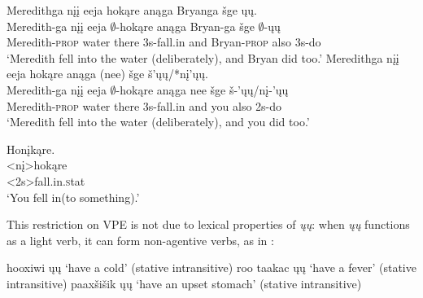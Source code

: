 \documentclass[output=paper]{LSP/langsci}
\begin{document}
\begin{exe}
\ex
\begin{xlist}
\ex
\glll Meredithga nįį eeja hokąre anąga Bryanga šge ųų.\\
Meredith-ga nįį eeja $\emptyset$-hokąre anąga Bryan-ga šge $\emptyset$-ųų\\
Meredith-\textsc{prop} water there {\textsc 3s}-fall.in and Bryan-\textsc{prop} also {\textsc 3s}-do\\
\trans `Meredith fell into the water (deliberately), and Bryan did too.'
\ex
\glll Meredithga nįį eeja hokąre anąga (nee) šge š'ųų/*nį'ųų.\\
Meredith-ga nįį eeja $\emptyset$-hokąre anąga nee šge š-'ųų/nį-'ųų\\
Meredith-\textsc{prop} water there {\textsc 3s}-fall.in and you also {\textsc 2s}-do\\
\trans `Meredith fell into the water (deliberately), and you did too.'
\end{xlist}
\end{exe}

\begin{exe}
\ex
\glll Honįkąre.\\
<nį>hokąre\\
<{\textsc 2s}>fall.in.{\textsc stat}\\
\trans `You fell in(to something).' \citep{Hartmann2012}
\end{exe}
	
This restriction on VPE is not due to lexical properties of \emph{ųų}: when \emph{ųų} functions as a light verb, it can form non-agentive verbs, as in :


\begin{singlespacing}
\begin{exe}
\ex
\begin{xlist}
\ex
hooxiwi ųų `have a cold' (stative intransitive)
\vspace{12pt}
\ex
roo taakac ųų `have a fever' (stative intransitive)
\vspace{12pt}
\ex
paaxšišik ųų `have an upset stomach' (stative intransitive)\\
\citep{Hartmann2012}
\end{xlist}
\end{exe}
\end{singlespacing}
\end{document}
